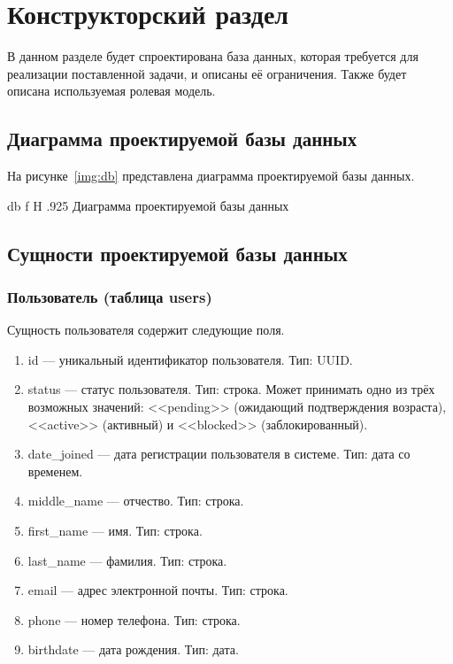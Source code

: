 \chapter{Конструкторский раздел}

В данном разделе будет спроектирована база данных, которая требуется для реализации поставленной задачи, и описаны её ограничения. Также будет описана используемая ролевая модель.

\section{Диаграмма проектируемой базы данных}

На рисунке~\ref{img:db} представлена диаграмма проектируемой базы данных.

    {db}
    {f}
    {H}
    {.925\textwidth}
    {Диаграмма проектируемой базы данных}

\section{Сущности проектируемой базы данных}

\subsection{Пользователь (таблица users)}

Сущность пользователя содержит следующие поля.

\begin{enumerate}
    \item id --- уникальный идентификатор пользователя. Тип: UUID.
    \item status --- статус пользователя. Тип: строка. Может принимать одно из трёх возможных значений: <<pending>> (ожидающий подтверждения возраста), <<active>> (активный) и <<blocked>> (заблокированный).
    \item date\_joined --- дата регистрации пользователя в системе. Тип: дата со временем.
    \item middle\_name --- отчество. Тип: строка.
    \item first\_name --- имя. Тип: строка.
    \item last\_name --- фамилия. Тип: строка.
    \item email --- адрес электронной почты. Тип: строка.
    \item phone --- номер телефона. Тип: строка.
    \item birthdate --- дата рождения. Тип: дата.
\end{enumerate}


